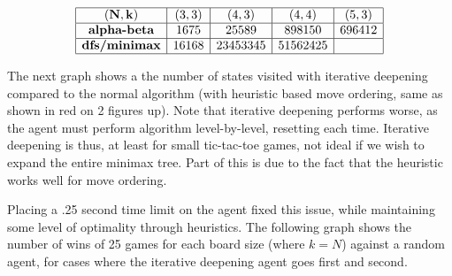 \[
\begin{array}{|c|c|c|c|c|}
    \hline\mathbf{(N,k)} & (3,3) & (4,3) & (4,4) & (5,3)\\
    \hline\textbf{alpha-beta}  & 1675& 25589& 898150&696412\\
    \hline\textbf{dfs/minimax} & 16168& 23453345& 51562425&\\
    \hline
\end{array}
\]

The next graph shows a the number of states visited with iterative deepening compared to the normal algorithm (with heuristic based move ordering, same as shown in red on 2 figures up). Note that iterative deepening performs worse, as the agent must perform algorithm level-by-level, resetting each time. Iterative deepening is thus, at least for small tic-tac-toe games, not ideal if we wish to expand the entire minimax tree. Part of this is due to the fact that the heuristic works well for move ordering.

\begin{center}
\end{center}

Placing a .25 second time limit on the agent fixed this issue, while maintaining some level of optimality through heuristics. The following graph shows the number of wins of 25 games for each board size (where \(k=N\)) against a random agent, for cases where the iterative deepening agent goes first and second.

